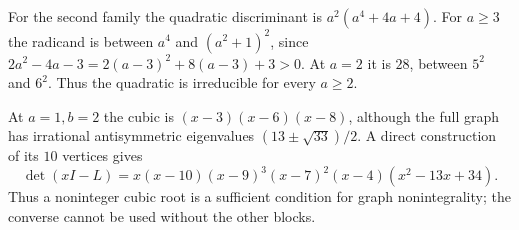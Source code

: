For the second family the quadratic discriminant is $a^2(a^4+4a+4)$.
For $a\geq3$ the radicand is between $a^4$ and $(a^2+1)^2$, since
$2a^2-4a-3=2(a-3)^2+8(a-3)+3>0$.
At $a=2$ it is $28$, between $5^2$ and $6^2$.
Thus the quadratic is irreducible for every $a\geq2$.

\begin{remark}
At $a=1,b=2$ the cubic is $(x-3)(x-6)(x-8)$, although the full graph
has irrational antisymmetric eigenvalues $(13\pm\sqrt{33})/2$.
A direct construction of its $10$ vertices gives
\[
\det(xI-L)=x(x-10)(x-9)^3(x-7)^2(x-4)(x^2-13x+34).
\]
Thus a noninteger cubic root is a sufficient condition for graph
nonintegrality; the converse cannot be used without the other blocks.
\end{remark}
